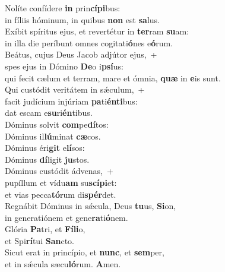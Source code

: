\evenverse Nolíte confídere \textbf{in} prin\textbf{cí}\textbf{pi}bus:~\*\\
\evenverse in fíliis hóminum, in quibus \textbf{non} est \textbf{sa}lus.\\
\oddverse Exíbit spíritus ejus, et revertétur in \textbf{ter}ram \textbf{su}am:~\*\\
\oddverse in illa die períbunt omnes cogitati\textbf{ó}nes e\textbf{ó}rum.\\
\evenverse Beátus, cujus Deus Jacob adjútor ejus,~+\\
\evenverse  spes ejus in Dómino \textbf{De}o i\textbf{psí}us:~\*\\
\evenverse qui fecit cælum et terram, mare et ómnia, \textbf{quæ} in \textbf{e}is sunt.\\
\oddverse Qui custódit veritátem in sǽculum,~+\\
\oddverse  facit judícium injúriam \textbf{pa}ti\textbf{én}\textbf{ti}bus:~\*\\
\oddverse dat escam e\textbf{su}ri\textbf{én}tibus.\\
\evenverse Dóminus solvit \textbf{com}pe\textbf{dí}tos:~\*\\
\evenverse Dóminus il\textbf{lú}minat \textbf{cæ}cos.\\
\oddverse Dóminus éri\textbf{git} e\textbf{lí}sos:~\*\\
\oddverse Dóminus \textbf{dí}ligit \textbf{ju}stos.\\
\evenverse Dóminus custódit ádvenas,~+\\
\evenverse  pupíllum et vídu\textbf{am} su\textbf{scí}\textbf{pi}et:~\*\\
\evenverse et vias pecca\textbf{tó}rum di\textbf{spér}det.\\
\oddverse Regnábit Dóminus in sǽcula, Deus \textbf{tu}us, \textbf{Si}on,~\*\\
\oddverse in generatiónem et gene\textbf{ra}ti\textbf{ó}nem.\\
\evenverse Glória \textbf{Pa}tri, et \textbf{Fí}\textbf{li}o,~\*\\
\evenverse et Spi\textbf{rí}tui \textbf{San}cto.\\
\oddverse Sicut erat in princípio, et \textbf{nunc}, et \textbf{sem}per,~\*\\
\oddverse et in sǽcula sæcu\textbf{ló}rum. \textbf{A}men.\\
